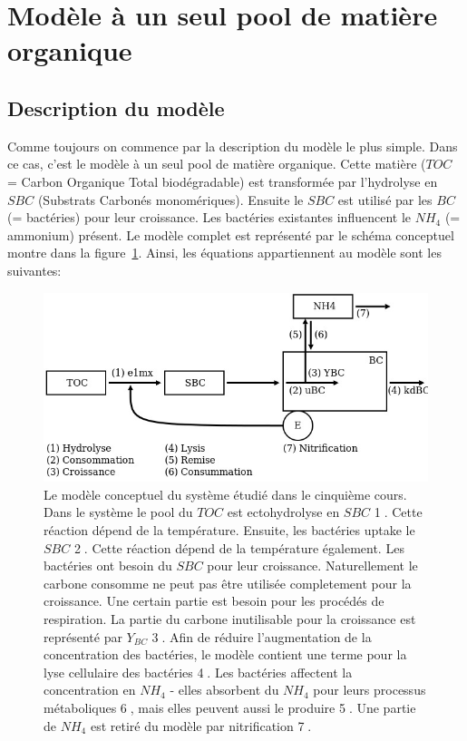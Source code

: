 \section{Mod\`ele \`a un seul pool de matière organique}
\subsection{Description du mod\`ele}

\par{
Comme toujours on commence par la description du modèle le plus simple. Dans ce cas, c'est le modèle
\`a un seul pool de matière organique. Cette matière ($TOC$ = Carbon Organique Total biodégradable)
est transformée par l'hydrolyse en $SBC$ (Substrats Carbonés monomériques). Ensuite le $SBC$ est
utilisé par les $BC$ (= bactéries) pour leur croissance. Les bactéries existantes influencent le $NH_4$
(= ammonium) présent. Le modèle complet est représenté par le schéma conceptuel montre dans la
figure~\ref{fig:partie1concModel}. Ainsi, les équations appartiennent au modèle sont les suivantes:
}

\begin{figure}[h!]
  \includegraphics[width=\textwidth]{partie1/scan1.jpg}
  \caption{Le modèle conceptuel du système étudié dans le cinquième cours. Dans le système le pool du
$TOC$ est ectohydrolyse en $SBC$ \textcircled{1}. Cette réaction dépend de la température. Ensuite, 
les bactéries uptake le $SBC$ \textcircled{2}. Cette réaction dépend de la température également. Les
bactéries ont besoin du $SBC$ pour leur croissance. Naturellement le carbone consomme ne peut pas être
utilisée completement pour la croissance. Une certain partie est besoin pour les procédés de
respiration. La partie du carbone inutilisable pour la croissance est représenté par $Y_{BC}$ \textcircled{3}.
Afin de réduire l'augmentation de la concentration des bactéries, le modèle contient une terme pour la lyse
cellulaire des bactéries \textcircled{4}. Les bactéries affectent la concentration en $NH_4$ -
elles absorbent du $NH_4$ pour leurs processus métaboliques \textcircled{6}, mais elles peuvent aussi le
produire \textcircled{5}. Une partie de $NH_4$ est retiré du modèle par nitrification \textcircled{7}.
}
  \label{fig:partie1concModel}
\end{figure}

